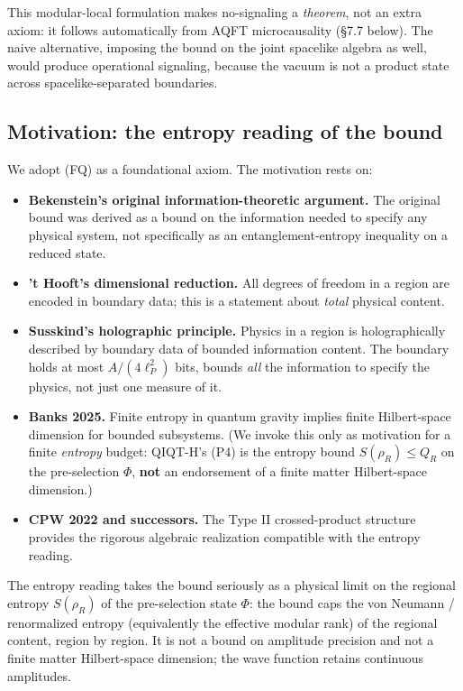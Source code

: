 \documentclass[11pt,a4paper]{article}
\begin{document}
This modular-local formulation makes no-signaling a \emph{theorem}, not an extra axiom: it follows automatically from AQFT microcausality (§7.7 below). The naive alternative, imposing the bound on the joint spacelike algebra as well, would produce operational signaling, because the vacuum is not a product state across spacelike-separated boundaries.

\subsection{Motivation: the entropy reading of the bound}

We adopt (FQ) as a foundational axiom. The motivation rests on:

\begin{itemize}
  \item \textbf{Bekenstein's original information-theoretic argument.} The original bound was derived as a bound on the information needed to specify any physical system, not specifically as an entanglement-entropy inequality on a reduced state.
  \item \textbf{'t Hooft's dimensional reduction.} All degrees of freedom in a region are encoded in boundary data; this is a statement about \emph{total} physical content.
  \item \textbf{Susskind's holographic principle.} Physics in a region is holographically described by boundary data of bounded information content. The boundary holds at most $A/(4\ell_P^2)$ bits, bounds \emph{all} the information to specify the physics, not just one measure of it.
  \item \textbf{Banks 2025.} Finite entropy in quantum gravity implies finite Hilbert-space dimension for bounded subsystems. (We invoke this only as motivation for a finite \emph{entropy} budget: QIQT-H's (P4) is the entropy bound $S(\rho_R) \le Q_R$ on the pre-selection $\Phi$, \textbf{not} an endorsement of a finite matter Hilbert-space dimension.)
  \item \textbf{CPW 2022 and successors.} The Type II crossed-product structure provides the rigorous algebraic realization compatible with the entropy reading.
\end{itemize}

The entropy reading takes the bound seriously as a physical limit on the regional entropy $S(\rho_R)$ of the pre-selection state $\Phi$: the bound caps the von Neumann / renormalized entropy (equivalently the effective modular rank) of the regional content, region by region. It is not a bound on amplitude precision and not a finite matter Hilbert-space dimension; the wave function retains continuous amplitudes.
\end{document}
